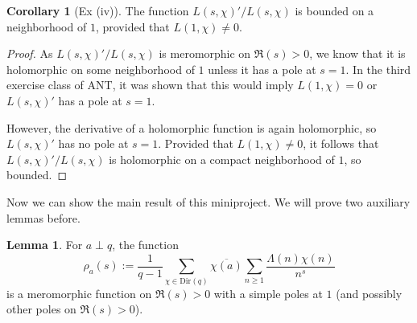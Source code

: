 \documentclass{scrartcl}
\theoremstyle{definition}
\newtheorem{lemma}[definition]{Lemma}
\newtheorem{corollary}[definition]{Corollary}
\begin{document}
\begin{corollary}[Ex (iv)]
    \label{prop:logarithmic_derivative_L_bounded}
    The function $L(s, \chi)'/L(s, \chi)$ is bounded on a neighborhood of $1$, provided that $L(1, \chi) \neq 0$.
\end{corollary}
\begin{proof}
    As $L(s, \chi)'/L(s, \chi)$ is meromorphic on $\Re(s) > 0$, we know that it is holomorphic on some neighborhood of $1$ unless it has a pole at $s = 1$.
    In the third exercise class of ANT, it was shown that this would imply $L(1, \chi) = 0$ or $L(s, \chi)'$ has a pole at $s = 1$.

    However, the derivative of a holomorphic function is again holomorphic, so $L(s, \chi)'$ has no pole at $s = 1$.
    Provided that $L(1, \chi) \neq 0$, it follows that $L(s, \chi)'/L(s, \chi)$ is holomorphic on a compact neighborhood of $1$, so bounded.
\end{proof}
Now we can show the main result of this miniproject.
We will prove two auxiliary lemmas before.
\begin{lemma}
    \label{prop:rho_pole_at_one}
    For $a \perp q$, the function
    \begin{equation*}
        \rho_a(s) := \frac 1 {q - 1} \sum_{\chi \in \mathrm{Dir}(q)} \overline{\chi(a)} \sum_{n \geq 1} \frac {\Lambda(n) \chi(n)} {n^s}
    \end{equation*}
    is a meromorphic function on $\Re(s) > 0$ with a simple poles at $1$ (and possibly other poles on $\Re(s) > 0$).
\end{lemma}
\end{document}
